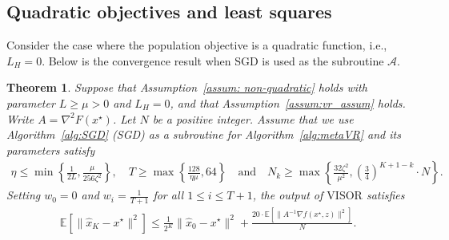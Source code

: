 \documentclass[11pt,twoside]{article}
\numberwithin{equation}{section}
\newcommand{\cA}{\mathcal{A}}
\newcommand{\EE}{\mathbb{E}}
\newcommand{\1}{\mathbf{1}}
\newtheorem{theorem}{Theorem}[section]
\theoremstyle{remark}
\theoremstyle{plain}
\newcommand{\liph}{L_H}
\newcommand{\algname}{\mathrm{VISOR}}
\begin{document}
\subsection{Quadratic objectives and least squares}\label{sec:quadratic_objective}
Consider the case where the population objective is a quadratic function, i.e., $\liph =0$. Below is the convergence result when SGD is used as the subroutine $\cA$. 
\begin{theorem}\label{thm:vr_quadratic}
Suppose that  Assumption~\ref{assum: non-quadratic} holds with parameter $L \ge \mu >0$ and $\liph = 0$, and that Assumption~\ref{assum:vr_assum} holds. Write $A = \nabla^2 F(x^\star)$. Let $N$ be a positive integer. Assume that we use Algorithm~\ref{alg:SGD} (SGD) as a subroutine for Algorithm~\ref{alg:metaVR} and its parameters satisfy
\begin{align*}
	\eta \le \min \left\{\frac{1}{2L}, \frac{\mu }{256\zeta^2}\right\}, \quad T \ge \max\left\{\frac{128}{\eta \mu}, 64\right\} \quad \text{and} \quad N_k \ge \max \left\{\frac{32\zeta^2}{\mu^2}, \left(\frac{3}{4}\right)^{K+1-k} \cdot N \right\}.
\end{align*}
Setting  $w_0 = 0$ and $w_i = \frac{1}{T+1}$ for all $1\le i \le T+1$, the output of $\algname$ satisfies
\begin{align*}
	\EE[\|\widehat x_K - x^\star\|^2] \le \frac{1}{2^K} \|\widehat x_0 - x^\star\|^2 + \frac{20\cdot \EE[\|A^{-1} \nabla f(x^\star, z)\|^2]}{N} .
\end{align*}

\end{theorem}
\end{document}
